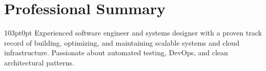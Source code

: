 \section{Professional Summary}
\begin{adjustwidth}{103pt}{0pt}
Experienced software engineer and systems designer with a proven track record of building, optimizing, and maintaining scalable systems and cloud infrastructure. Passionate about automated testing, DevOps, and clean architectural patterns.
\end{adjustwidth}